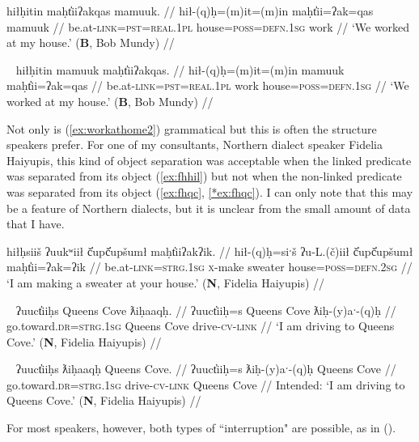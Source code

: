 \ex \label{ex:workathome}
\begingl
\glpreamble hiłḥitin maḥt̓iiʔakqas mamuuk. //
\gla hił-(q)ḥ=(m)it=(m)in maḥt̓ii=ʔak=qas mamuuk //
\glb be.at-\textsc{link}=\textsc{pst}=\textsc{real.1pl} house=\textsc{poss}=\textsc{defn.1sg} work //
\glft `We worked at my house.' (\textbf{B}, Bob Mundy) //
\endgl
\xe

\ex~ \label{ex:workathome2}
\begingl
\glpreamble hiłḥitin mamuuk maḥt̓iiʔakqas. //
\gla hił-(q)ḥ=(m)it=(m)in mamuuk maḥt̓ii=ʔak=qas //
\glb be.at-\textsc{link}=\textsc{pst}=\textsc{real.1pl} work house=\textsc{poss}=\textsc{defn.1sg} //
\glft `We worked at my house.' (\textbf{B}, Bob Mundy) //
\endgl
\xe

Not only is (\ref{ex:workathome2}) grammatical but this is often the structure speakers prefer. For one of my consultants, Northern dialect speaker Fidelia Haiyupis, this kind of object separation was acceptable when the linked predicate was separated from its object (\ref{ex:fhhil}) but not when the non-linked predicate was separated from its object (\ref{ex:fhqc}, \ref{*ex:fhqc}). I can only note that this may be a feature of Northern dialects, but it is unclear from the small amount of data that I have. %

\ex \label{ex:fhhil}
\begingl
\glpreamble hiłḥsiiš ʔuukʷiił č̓upč̓upšumł maḥt̓iiʔakʔik. //
\gla hił-(q)ḥ=siˑš ʔu-L.(č)iił č̓upč̓upšumł maḥt̓ii=ʔak=ʔik //
\glb be.at-\textsc{link}=\textsc{strg.1sg} \textsc{x}-make sweater house=\textsc{poss}=\textsc{defn.2sg} //
\glft `I am making a sweater at your house.' (\textbf{N}, Fidelia Haiyupis) //
\endgl
\xe

\ex~ \label{ex:fhqc}
\begingl
\glpreamble ʔuuct̓iiḥs Queens Cove ƛiḥaaqḥ. //
\gla ʔuuct̓iiḥ=s Queens Cove ƛiḥ-(y)aˑ-(q)ḥ //
\glb go.toward.\textsc{dr}=\textsc{strg.1sg} Queens Cove drive-\textsc{cv}-\textsc{link} //
\glft `I am driving to Queens Cove.' (\textbf{N}, Fidelia Haiyupis) //
\endgl
\xe

\ex~ \label{*ex:fhqc}
\begingl
\glpreamble *ʔuuct̓iiḥs ƛiḥaaqḥ Queens Cove. //
\gla ʔuuct̓iiḥ=s ƛiḥ-(y)aˑ-(q)ḥ Queens Cove //
\glb go.toward.\textsc{dr}=\textsc{strg.1sg} drive-\textsc{cv}-\textsc{link} Queens Cove //
\glft Intended: `I am driving to Queens Cove.' (\textbf{N}, Fidelia Haiyupis) //
\endgl
\xe

\noindent For most speakers, however, both types of ``interruption" are possible, as in ().

